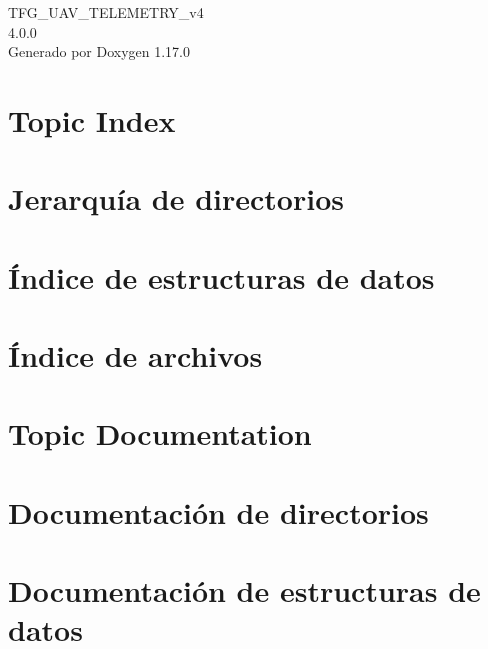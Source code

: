 \documentclass[twoside]{book}
\newcommand{\+}{\discretionary{\mbox{\scriptsize$\hookleftarrow$}}{}{}}
\newcommand{\clearemptydoublepage}{%
    \newpage{\pagestyle{empty}\cleardoublepage}%
  }
\begin{document}
  \raggedbottom
    \hypersetup{pageanchor=false,
                bookmarksnumbered=true,
                pdfencoding=unicode
               }
  \begin{titlepage}
  \vspace*{7cm}
  \begin{center}%
  {\Large TFG\+\_\+\+UAV\+\_\+\+TELEMETRY\+\_\+v4}\\
  [1ex]\large 4.\+0.\+0 \\
  \vspace*{1cm}
  {\large Generado por Doxygen 1.17.0}\\
  \end{center}
  \end{titlepage}
  \clearemptydoublepage
  \tableofcontents
  \clearemptydoublepage
  \hypersetup{pageanchor=true}
\chapter{Topic Index}

\chapter{Jerarquía de directorios}

\chapter{Índice de estructuras de datos}

\chapter{Índice de archivos}

\chapter{Topic Documentation}



\chapter{Documentación de directorios}



\chapter{Documentación de estructuras de datos}





\end{document}
